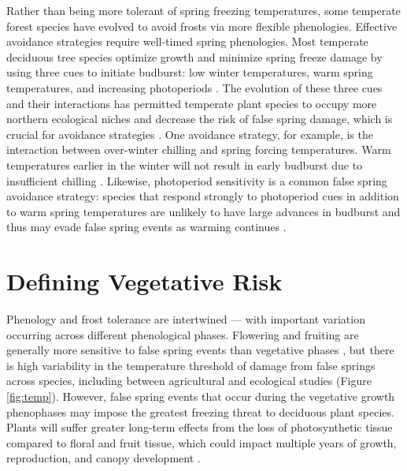 \documentclass{article}\usepackage[]{graphicx}\usepackage[]{color}
\begin{document}
Rather than being more tolerant of spring freezing temperatures, some temperate forest species have evolved to avoid frosts via more flexible phenologies. Effective avoidance strategies require well-timed spring phenologies. Most temperate deciduous tree species optimize growth and minimize spring freeze damage by using three cues to initiate budburst: low winter temperatures, warm spring temperatures, and increasing photoperiods \citep{Chuine2010}. The evolution of these three cues and their interactions has permitted temperate plant species to occupy more northern ecological niches \citep{Kollas2014} and decrease the risk of false spring damage, which is crucial for avoidance strategies \citep{Charrier2011}. One avoidance strategy, for example, is the interaction between over-winter chilling and spring forcing temperatures. Warm temperatures earlier in the winter %
will not result in early budburst due to insufficient chilling \citep{Basler2012}. Likewise, photoperiod sensitivity is a common false spring avoidance strategy: species that respond strongly to photoperiod cues in addition to warm spring temperatures are unlikely to have large advances in budburst and thus may evade false spring events as warming continues \citep{Basler2014}. 

\section {Defining Vegetative Risk} %
Phenology and frost tolerance are intertwined --- with important variation occurring across different phenological phases. Flowering and fruiting are generally more sensitive to false spring events than vegetative phases \citep{Augspurger2009, Lenz2013}, but there is high variability in the temperature threshold of damage from false springs across species, including between agricultural and ecological studies (Figure \ref{fig:temp}). However, false spring events that occur during the vegetative growth phenophases may impose the greatest freezing threat to deciduous plant species. Plants will suffer greater long-term effects from the loss of photosynthetic tissue compared to floral and fruit tissue, which could impact multiple years of growth, reproduction, and canopy development \citep{Vitasse2014, Xie2015}. 
\end{document}
